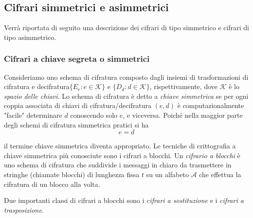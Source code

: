 \documentclass{article}
\theoremstyle{definition}
\begin{document}



\subsection{Cifrari simmetrici e asimmetrici}
Verrà riportata di seguito una descrizione dei cifrari di tipo simmetrico e cifrari di tipo asimmetrico.
\subsubsection{Cifrari a chiave segreta o simmetrici}

Consideriamo uno schema di cifratura composto dagli insiemi di trasformazioni di cifratura e decifratura\(\{E_e : e \in \mathcal{K}\}\) e \(\{D_d : d \in \mathcal{K}\}\), rispettivamente, dove \( \mathcal{K} \) è lo \textit{spazio delle chiavi}. Lo schema di cifratura è detto a \textit{chiave simmetrica} se per ogni coppia associata di chiavi di cifratura/decifratura \((e, d)\) è computazionalmente "facile" determinare \(d\) conoscendo solo \(e\), e viceversa.
Poiché nella maggior parte degli schemi di cifratura simmetrica pratici si ha 
\begin{equation*}
e = d
\end{equation*}

il termine chiave simmetrica diventa appropriato. Le tecniche di crittografia a chiave simmetrica più conosciute sono i cifrari a blocchi. Un \textit{cifrario a blocchi} è uno schema di cifratura che suddivide i messaggi in chiaro da trasmettere in stringhe (chiamate blocchi) di lunghezza fissa \( t \) su un alfabeto \( \mathcal{A} \) che effettua la cifratura di un blocco alla volta. 

Due importanti classi di cifrari a blocchi sono i \textit{cifrari a sostituzione} e i \textit{cifrari a trasposizione}.
\end{document}
